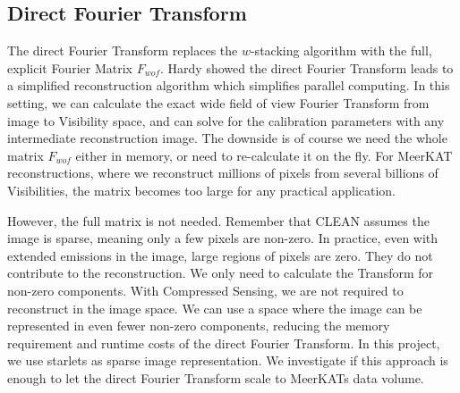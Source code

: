 \subsection{Direct Fourier Transform}
The direct Fourier Transform replaces the $w$-stacking algorithm with the full, explicit Fourier Matrix $F_{wof}$. Hardy\cite{hardy2013direct} showed the direct Fourier Transform leads to a simplified reconstruction algorithm which simplifies parallel computing. In this setting, we can calculate the exact wide field of view Fourier Transform from image to Visibility space, and can solve for the calibration parameters with any intermediate reconstruction image. The downside is of course we need the whole matrix $F_{wof}$ either in memory, or need to re-calculate it on the fly. For MeerKAT reconstructions, where we reconstruct millions of pixels from several billions of Visibilities, the matrix becomes too large for any practical application.

However, the full matrix is not needed. Remember that CLEAN assumes the image is sparse, meaning only a few pixels are non-zero. In practice, even with extended emissions in the image, large regions of pixels are zero. They do not contribute to the reconstruction. We only need to calculate the Transform for non-zero components. With Compressed Sensing, we are not required to reconstruct in the image space. We can use a space where the image can be represented in even fewer non-zero components, reducing the memory requirement and runtime costs of the direct Fourier Transform. In this project, we use starlets as sparse image representation. We investigate if this approach is enough to let the direct Fourier Transform scale to MeerKATs data volume. 

